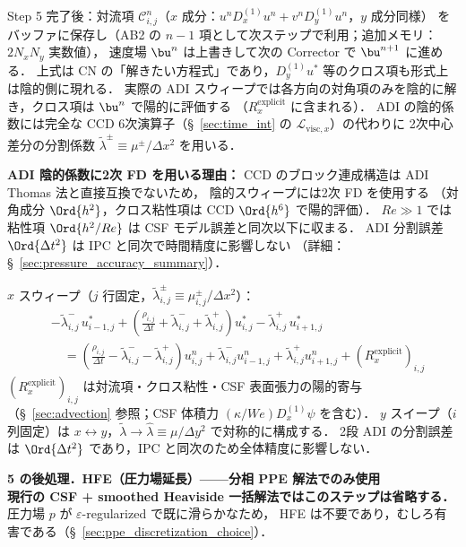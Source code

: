 Step 5 完了後：対流項 $\mathcal{C}^n_{i,j}$（$x$ 成分：$u^n D_x^{(1)}u^n + v^n D_y^{(1)}u^n$，$y$ 成分同様）
をバッファに保存し（AB2 の $n-1$ 項として次ステップで利用；追加メモリ：$2N_xN_y$ 実数値），
速度場 $\bu^n$ は上書きして次の Corrector で $\bu^{n+1}$ に進める．
上式は CN の「解きたい方程式」であり，$D_y^{(1)} u^*$ 等のクロス項も形式上は陰的側に現れる．
実際の ADI スウィープでは各方向の対角項のみを陰的に解き，クロス項は $\bu^n$ で陽的に評価する
（$R^{\text{explicit}}_x$ に含まれる）．
ADI の陰的係数には完全な CCD 6次演算子（§~\ref{sec:time_int} の $\mathcal{L}_{\text{visc},x}$）の代わりに
2次中心差分の分割係数 $\tilde\lambda^\pm \equiv \mu^\pm/\Delta x^2$ を用いる．

\noindent\textbf{ADI 陰的係数に2次 FD を用いる理由：}
CCD のブロック連成構造は ADI Thomas 法と直接互換でないため，
陰的スウィープには2次 FD を使用する
（対角成分 $\Ord{h^2}$，クロス粘性項は CCD $\Ord{h^6}$ で陽的評価）．
$Re \gg 1$ では粘性項 $\Ord{h^2/Re}$ は CSF モデル誤差と同次以下に収まる．
ADI 分割誤差 $\Ord{\Delta t^2}$ は IPC と同次で時間精度に影響しない
（詳細：§~\ref{sec:pressure_accuracy_summary}）．

\medskip
$x$ スウィープ（$j$ 行固定，$\tilde\lambda^\pm_{i,j} \equiv \mu^\pm_{i,j}/\Delta x^2$）：
\begin{equation*}
\begin{split}
  &-\tilde\lambda^-_{i,j}\,u^*_{i-1,j}
  + \!\left(\frac{\rho_{i,j}}{\Delta t} + \tilde\lambda^-_{i,j} + \tilde\lambda^+_{i,j}\right)\!u^*_{i,j}
  - \tilde\lambda^+_{i,j}\,u^*_{i+1,j} \\
  &\quad= \left(\frac{\rho_{i,j}}{\Delta t} - \tilde\lambda^-_{i,j} - \tilde\lambda^+_{i,j}\right)u^n_{i,j}
  + \tilde\lambda^-_{i,j} u^n_{i-1,j}
  + \tilde\lambda^+_{i,j} u^n_{i+1,j}
  + (R^{\text{explicit}}_x)_{i,j}
\end{split}
\end{equation*}
$(R^{\text{explicit}}_x)_{i,j}$ は対流項・クロス粘性・CSF 表面張力の陽的寄与（§~\ref{sec:advection} 参照；CSF 体積力 $(\kappa/We)D_x^{(1)}\psi$ を含む）．
$y$ スイープ（$i$ 列固定）は $x \leftrightarrow y$，$\tilde\lambda \to \hat\lambda \equiv \mu/\Delta y^2$ で対称的に構成する．
2段 ADI の分割誤差は $\Ord{\Delta t^2}$ であり，IPC と同次のため全体精度に影響しない．

\textbf{5 の後処理．HFE（圧力場延長）——分相 PPE 解法でのみ使用} \\
\noindent\textbf{現行の CSF + smoothed Heaviside 一括解法ではこのステップは省略する．}
圧力場 $p$ が $\varepsilon$-regularized で既に滑らかなため，
HFE は不要であり，むしろ有害である（§~\ref{sec:ppe_discretization_choice}）．

